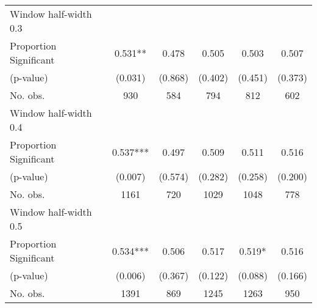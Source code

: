 \begin{tabular}{l*{5}{c}}
\hline
Window half-width 0.3\\

Proportion Significant& 0.531** &  0.478 &  0.505 &  0.503 &  0.507\\

(p-value) & (0.031) &  (0.868) &  (0.402) &  (0.451) &  (0.373)\\

No. obs.& 930 &  584 &  794 &  812 &  602\\

\hline
Window half-width 0.4\\

Proportion Significant& 0.537*** &  0.497 &  0.509 &  0.511 &  0.516\\

(p-value) & (0.007) &  (0.574) &  (0.282) &  (0.258) &  (0.200)\\

No. obs.& 1161 &  720 &  1029 &  1048 &  778\\

\hline
Window half-width 0.5\\

Proportion Significant& 0.534*** &  0.506 &  0.517 &  0.519* &  0.516\\

(p-value) & (0.006) &  (0.367) &  (0.122) &  (0.088) &  (0.166)\\

No. obs.& 1391 &  869 &  1245 &  1263 &  950\\

\hline\hline
\end{tabular}

